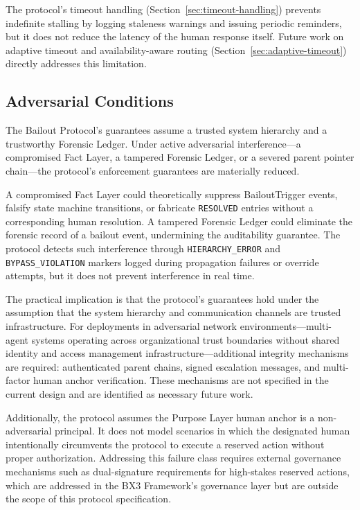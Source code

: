 The protocol's timeout handling (Section~\ref{sec:timeout-handling}) prevents indefinite stalling by logging staleness warnings and issuing periodic reminders, but it does not reduce the latency of the human response itself. Future work on adaptive timeout and availability-aware routing (Section~\ref{sec:adaptive-timeout}) directly addresses this limitation.

\subsection{Adversarial Conditions}
\label{sec:adversarial-conditions}

The Bailout Protocol's guarantees assume a trusted system hierarchy and a trustworthy Forensic Ledger. Under active adversarial interference---a compromised Fact Layer, a tampered Forensic Ledger, or a severed parent pointer chain---the protocol's enforcement guarantees are materially reduced.

A compromised Fact Layer could theoretically suppress BailoutTrigger events, falsify state machine transitions, or fabricate \texttt{RESOLVED} entries without a corresponding human resolution. A tampered Forensic Ledger could eliminate the forensic record of a bailout event, undermining the auditability guarantee. The protocol detects such interference through \texttt{HIERARCHY\_ERROR} and \texttt{BYPASS\_VIOLATION} markers logged during propagation failures or override attempts, but it does not prevent interference in real time.

The practical implication is that the protocol's guarantees hold under the assumption that the system hierarchy and communication channels are trusted infrastructure. For deployments in adversarial network environments---multi-agent systems operating across organizational trust boundaries without shared identity and access management infrastructure---additional integrity mechanisms are required: authenticated parent chains, signed escalation messages, and multi-factor human anchor verification. These mechanisms are not specified in the current design and are identified as necessary future work.

Additionally, the protocol assumes the Purpose Layer human anchor is a non-adversarial principal. It does not model scenarios in which the designated human intentionally circumvents the protocol to execute a reserved action without proper authorization. Addressing this failure class requires external governance mechanisms such as dual-signature requirements for high-stakes reserved actions, which are addressed in the BX3 Framework's governance layer but are outside the scope of this protocol specification.

